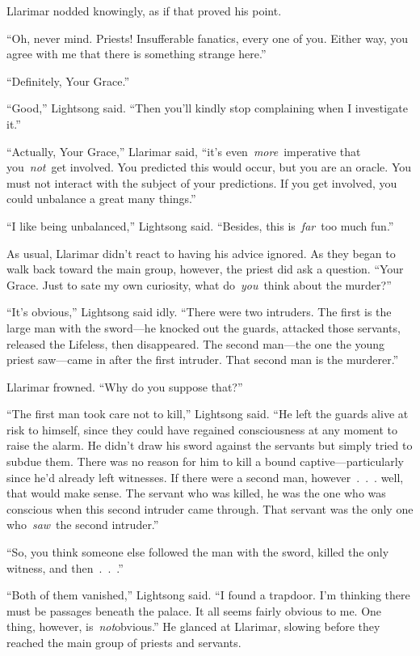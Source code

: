 Llarimar nodded knowingly, as if that proved his point.

“Oh, never mind. Priests! Insufferable fanatics, every one of you. Either way, you agree with me that there is something strange here.”

“Definitely, Your Grace.”

“Good,” Lightsong said. “Then you’ll kindly stop complaining when I investigate it.”

“Actually, Your Grace,” Llarimar said, “it’s even~\textit{more}~imperative that you~\textit{not}~get involved. You predicted this would occur, but you are an oracle. You must not interact with the subject of your predictions. If you get involved, you could unbalance a great many things.”

“I like being unbalanced,” Lightsong said. “Besides, this is~\textit{far}~too much fun.”

As usual, Llarimar didn’t react to having his advice ignored. As they began to walk back toward the main group, however, the priest did ask a question. “Your Grace. Just to sate my own curiosity, what do~\textit{you}~think about the murder?”

“It’s obvious,” Lightsong said idly. “There were two intruders. The first is the large man with the sword—he knocked out the guards, attacked those servants, released the Lifeless, then disappeared. The second man—the one the young priest saw—came in after the first intruder. That second man is the murderer.”

Llarimar frowned. “Why do you suppose that?”

“The first man took care not to kill,” Lightsong said. “He left the guards alive at risk to himself, since they could have regained consciousness at any moment to raise the alarm. He didn’t draw his sword against the servants but simply tried to subdue them. There was no reason for him to kill a bound captive—particularly since he’d already left witnesses. If there were a second man, however~.~.~. well, that would make sense. The servant who was killed, he was the one who was conscious when this second intruder came through. That servant was the only one who~\textit{saw}~the second intruder.”

“So, you think someone else followed the man with the sword, killed the only witness, and then~.~.~.”

“Both of them vanished,” Lightsong said. “I found a trapdoor. I’m thinking there must be passages beneath the palace. It all seems fairly obvious to me. One thing, however, is~\textit{not}obvious.” He glanced at Llarimar, slowing before they reached the main group of priests and servants.

